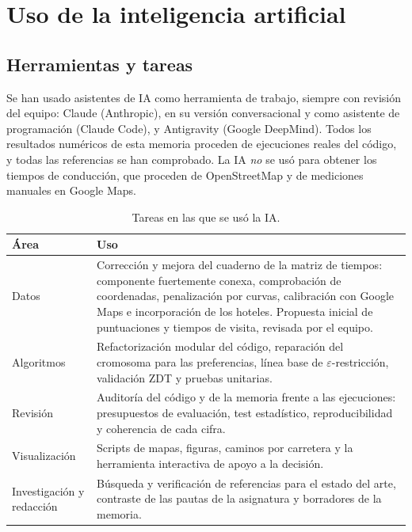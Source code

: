 \section{Uso de la inteligencia artificial}
\label{sec:ia}

\subsection{Herramientas y tareas}

Se han usado asistentes de IA como herramienta de trabajo, siempre con revisión del equipo: Claude (Anthropic), en su versión conversacional y como asistente de programación (Claude Code), y Antigravity (Google DeepMind). Todos los resultados numéricos de esta memoria proceden de ejecuciones reales del código, y todas las referencias se han comprobado. La IA \emph{no} se usó para obtener los tiempos de conducción, que proceden de OpenStreetMap y de mediciones manuales en Google Maps.

\begin{table}[H]
\centering
\small
\caption{Tareas en las que se usó la IA.}
\label{tab:ia_tareas}
\begin{tabularx}{\textwidth}{@{}l X@{}}
\toprule
Área & Uso \\
\midrule
Datos & Corrección y mejora del cuaderno de la matriz de tiempos: componente fuertemente conexa, comprobación de coordenadas, penalización por curvas, calibración con Google Maps e incorporación de los hoteles. Propuesta inicial de puntuaciones y tiempos de visita, revisada por el equipo. \\
Algoritmos & Refactorización modular del código, reparación del cromosoma para las preferencias, línea base de $\varepsilon$-restricción, validación ZDT y pruebas unitarias. \\
Revisión & Auditoría del código y de la memoria frente a las ejecuciones: presupuestos de evaluación, test estadístico, reproducibilidad y coherencia de cada cifra. \\
Visualización & Scripts de mapas, figuras, caminos por carretera y la herramienta interactiva de apoyo a la decisión. \\
Investigación y redacción & Búsqueda y verificación de referencias para el estado del arte, contraste de las pautas de la asignatura y borradores de la memoria. \\
\bottomrule
\end{tabularx}
\end{table}

